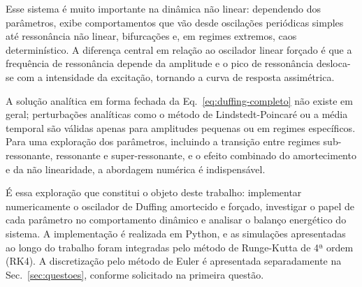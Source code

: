Esse sistema é muito importante na dinâmica não linear: dependendo dos parâmetros, exibe comportamentos que vão desde oscilações periódicas simples até ressonância não linear, bifurcações e, em regimes extremos, caos determinístico. A diferença central em relação ao oscilador linear forçado é que a frequência de ressonância depende da amplitude e o pico de ressonância desloca-se com a intensidade da excitação, tornando a curva de resposta assimétrica.

A solução analítica em forma fechada da Eq.~\ref{eq:duffing-completo} não existe em geral; perturbações analíticas como o método de Lindstedt-Poincaré ou a média temporal são válidas apenas para amplitudes pequenas ou em regimes específicos. Para uma exploração dos parâmetros, incluindo a transição entre regimes sub-ressonante, ressonante e super-ressonante, e o efeito combinado do amortecimento e da não linearidade, a abordagem numérica é indispensável.

É essa exploração que constitui o objeto deste trabalho: implementar numericamente o oscilador de Duffing amortecido e forçado, investigar o papel de cada parâmetro no comportamento dinâmico e analisar o balanço energético do sistema. A implementação é realizada em Python, e as simulações apresentadas ao longo do trabalho foram integradas pelo método de Runge-Kutta de 4ª ordem (RK4). A discretização pelo método de Euler é apresentada separadamente na Sec.~\ref{sec:questoes}, conforme solicitado na primeira questão.
